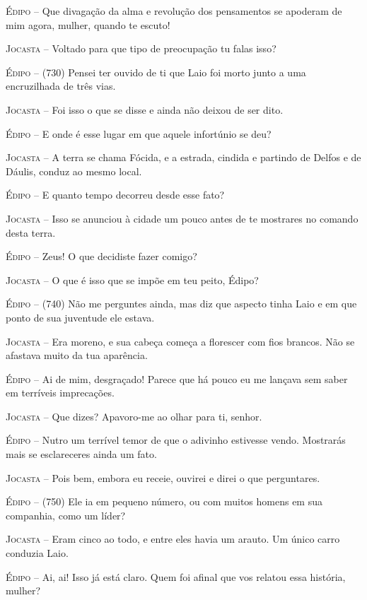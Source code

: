 \textsc{Édipo} --   Que divagação da alma e revolução dos pensamentos se apoderam de mim
agora, mulher, quando te escuto!

\textsc{Jocasta} --   Voltado para que tipo de preocupação tu falas isso?

\textsc{Édipo} --   (730) Pensei ter ouvido de ti que Laio foi morto junto a uma
encruzilhada de três vias.

\textsc{Jocasta} --   Foi isso o que se disse e ainda não deixou de ser dito.

\textsc{Édipo} --   E onde é esse lugar em que aquele infortúnio se deu?

\textsc{Jocasta} --   A terra se chama Fócida, e a estrada, cindida e partindo de Delfos e de
Dáulis, conduz ao mesmo local.

\textsc{Édipo} --   E quanto tempo decorreu desde esse fato?

\textsc{Jocasta} --   Isso se anunciou à cidade um pouco antes de te mostrares no comando
desta terra.

\textsc{Édipo} --   Zeus! O que decidiste fazer comigo?

\textsc{Jocasta} --   O que é isso que se impõe em teu peito, Édipo?

\textsc{Édipo} --   (740) Não me perguntes ainda, mas diz que aspecto tinha Laio e em que
ponto de sua juventude ele estava.

\textsc{Jocasta} --   Era moreno, e sua cabeça começa a florescer com fios brancos. Não se
afastava muito da tua aparência.

\textsc{Édipo} --   Ai de mim, desgraçado! Parece que há pouco eu me lançava sem saber em
terríveis imprecações.

\textsc{Jocasta} --   Que dizes? Apavoro-me ao olhar para ti, senhor.

\textsc{Édipo} --   Nutro um terrível temor de que o adivinho estivesse vendo. Mostrarás
mais se esclareceres ainda um fato.

\textsc{Jocasta} --   Pois bem, embora eu receie, ouvirei e direi o que perguntares.

\textsc{Édipo} --   (750) Ele ia em pequeno número, ou com muitos homens em sua companhia,
como um líder?

\textsc{Jocasta} --   Eram cinco ao todo, e entre eles havia um arauto. Um único carro
conduzia Laio.

\textsc{Édipo} --   Ai, ai! Isso já está claro. Quem foi afinal que vos relatou essa
história, mulher?

